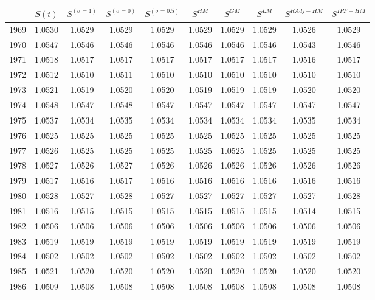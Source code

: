\begin{tabular}{cccccccccc}
  \hline
 & $S(t)$ & $S^{(\sigma = 1)}$ & $S^{(\sigma = 0)}$ & $S^{(\sigma = 0.5)}$ & $S^{HM}$ & $S^{GM}$ & $S^{LM}$ & $S^{RAdj-HM}$ & $S^{IPF-HM}$ \\ 
  \hline
1969 & 1.0530 & 1.0529 & 1.0529 & 1.0529 & 1.0529 & 1.0529 & 1.0529 & 1.0526 & 1.0529 \\ 
  1970 & 1.0547 & 1.0546 & 1.0546 & 1.0546 & 1.0546 & 1.0546 & 1.0546 & 1.0543 & 1.0546 \\ 
  1971 & 1.0518 & 1.0517 & 1.0517 & 1.0517 & 1.0517 & 1.0517 & 1.0517 & 1.0516 & 1.0517 \\ 
  1972 & 1.0512 & 1.0510 & 1.0511 & 1.0510 & 1.0510 & 1.0510 & 1.0510 & 1.0510 & 1.0510 \\ 
  1973 & 1.0521 & 1.0519 & 1.0520 & 1.0520 & 1.0519 & 1.0519 & 1.0519 & 1.0520 & 1.0520 \\ 
  1974 & 1.0548 & 1.0547 & 1.0548 & 1.0547 & 1.0547 & 1.0547 & 1.0547 & 1.0547 & 1.0547 \\ 
  1975 & 1.0537 & 1.0534 & 1.0535 & 1.0534 & 1.0534 & 1.0534 & 1.0534 & 1.0535 & 1.0534 \\ 
  1976 & 1.0525 & 1.0525 & 1.0525 & 1.0525 & 1.0525 & 1.0525 & 1.0525 & 1.0525 & 1.0525 \\ 
  1977 & 1.0526 & 1.0525 & 1.0525 & 1.0525 & 1.0525 & 1.0525 & 1.0525 & 1.0525 & 1.0525 \\ 
  1978 & 1.0527 & 1.0526 & 1.0527 & 1.0526 & 1.0526 & 1.0526 & 1.0526 & 1.0526 & 1.0526 \\ 
  1979 & 1.0517 & 1.0516 & 1.0517 & 1.0516 & 1.0516 & 1.0516 & 1.0516 & 1.0516 & 1.0516 \\ 
  1980 & 1.0528 & 1.0527 & 1.0528 & 1.0527 & 1.0527 & 1.0527 & 1.0527 & 1.0527 & 1.0528 \\ 
  1981 & 1.0516 & 1.0515 & 1.0515 & 1.0515 & 1.0515 & 1.0515 & 1.0515 & 1.0514 & 1.0515 \\ 
  1982 & 1.0506 & 1.0506 & 1.0506 & 1.0506 & 1.0506 & 1.0506 & 1.0506 & 1.0506 & 1.0506 \\ 
  1983 & 1.0519 & 1.0519 & 1.0519 & 1.0519 & 1.0519 & 1.0519 & 1.0519 & 1.0519 & 1.0519 \\ 
  1984 & 1.0502 & 1.0502 & 1.0502 & 1.0502 & 1.0502 & 1.0502 & 1.0502 & 1.0502 & 1.0502 \\ 
  1985 & 1.0521 & 1.0520 & 1.0520 & 1.0520 & 1.0520 & 1.0520 & 1.0520 & 1.0520 & 1.0520 \\ 
  1986 & 1.0509 & 1.0508 & 1.0508 & 1.0508 & 1.0508 & 1.0508 & 1.0508 & 1.0508 & 1.0508 \\ 

\end{tabular}
